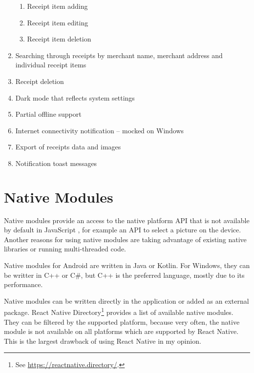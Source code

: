 \documentclass[
  digital, %
  table,   %
  oneside, %
  lof,     %
  lot,     %
]{fithesis3}
\begin{document}
\begin{enumerate}
\begin{enumerate}
            \item Receipt item adding
            \item Receipt item editing
            \item Receipt item deletion
        \end{enumerate}
    \item Searching through receipts by merchant name, merchant address and individual receipt items
    \item Receipt deletion
    \item Dark mode that reflects system settings
    \item Partial offline support
    \item Internet connectivity notification -- mocked on Windows
    \item Export of receipts data and images
    \item Notification toast messages
\end{enumerate}

\chapter{Native Modules}
Native modules provide an access to the native platform API that is not available by default in JavaScript \cite{RNNativeModulesIntro}, for example an API to select a picture on the device. Another reasons for using native modules are taking advantage of existing native libraries or running multi-threaded code.

Native modules for Android are written in Java or Kotlin.
For Windows, they can be writter in C++ or C\#, but C++ is the preferred language, mostly due to its performance.

Native modules can be written directly in the application or added as an external package. React Native Directory\footnote{See \url{https://reactnative.directory/}.} provides a list of available native modules. They can be filtered by the supported platform, because very often, the native module is not available on all platforms which are supported by React Native. This is the largest drawback of using React Native in my opinion. 
\end{document}

